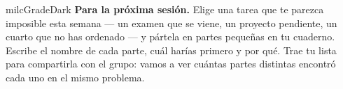 \documentclass[11pt,letterpaper]{article}
\begin{document}
\begin{infoband}{milcGradeDark}
\textbf{Para la próxima sesión.} Elige una tarea que te parezca imposible esta semana --- un examen que se viene, un proyecto pendiente, un cuarto que no has ordenado --- y pártela en partes pequeñas en tu cuaderno. Escribe el nombre de cada parte, cuál harías primero y por qué. Trae tu lista para compartirla con el grupo: vamos a ver cuántas partes distintas encontró cada uno en el mismo problema.
\end{infoband}
\end{document}
